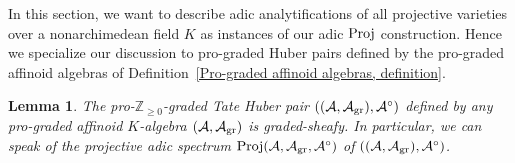 \documentclass[12pt,twoside,a4paper]{article}
\newtheorem{lemma}[thm]{Lemma}
\theoremstyle{definition}
\theoremstyle{remark}
\newcommand\gr{{\rm gr}}
\newcommand\Proj{{\rm Proj}}
\begin{document}
In this section, we want to describe adic analytifications of all projective varieties over a nonarchimedean field $K$ as instances of our adic $\Proj$ construction. Hence we specialize our discussion to pro-graded Huber pairs defined by the pro-graded affinoid algebras of Definition~\ref{Pro-graded affinoid algebras, definition}. 
\begin{lemma}\label{Pro-graded affinoids are graded-sheafy}The pro-$\mathbb{Z}_{\geq0}$-graded Tate Huber pair $((\mathcal{A}, \mathcal{A}_{\gr}), \mathcal{A}^{\circ})$ defined by any pro-graded affinoid $K$-algebra $(\mathcal{A}, \mathcal{A}_{\gr})$ is graded-sheafy. In particular, we can speak of the projective adic spectrum $\Proj(\mathcal{A}, \mathcal{A}_{\gr}, \mathcal{A}^{\circ})$ of $((\mathcal{A}, \mathcal{A}_{\gr}), \mathcal{A}^{\circ})$.\end{lemma}
\end{document}
